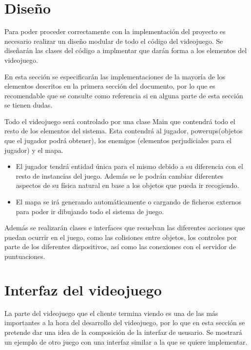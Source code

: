 \documentclass[palatino]{apuntes}
\begin{document}
\section{Diseño}

Para poder proceder correctamente con la implementación del proyecto es necesario realizar un diseño modular de todo el código del videojuego. Se diseñarán las clases del código a implmentar que darán forma a los elementos del videojuego.

En esta sección se especificarán las implementaciones de la mayoría de los elementos descritos en la primera sección del documento, por lo que es recomendable que se consulte como referencia si en alguna parte de esta sección se tienen dudas.

Todo el videojuego será controlado por una clase Main que contendrá todo el resto de los elementos del sistema. Esta contendrá al jugador, powerups(objetos que el jugador podrá obtener), los enemigos (elementos perjudiciales para el jugador) y el mapa.

\begin{itemize}
	\item El jugador tendrá entidad única para el mismo debido a su diferencia con el resto de instancias del juego. Además se le podrán cambiar diferentes aspectos de su física natural en base a los objetos que pueda ir recogiendo.

	\item El mapa se irá generando automáticamente o cargando de ficheros externos para poder ir dibujando todo el sistema de juego.
\end{itemize}

Además se realizarán clases e interfaces que resuelvan las diferentes acciones que puedan ocurrir en el juego, como las colisiones entre objetos, los controles por parte de los diferentes dispositivos, así como las conexiones con el servidor de puntuaciones.


\section{Interfaz del videojuego}
La parte del videojuego que el cliente termina viendo es una de las más importantes a la hora del desarrollo del videojuego, por lo que en esta sección se pretende dar una idea de la composición de la interfaz de ususario. Se mostrará un ejemplo de otro juego con una interfaz similar a la que se quiere implementar.
\end{document}
